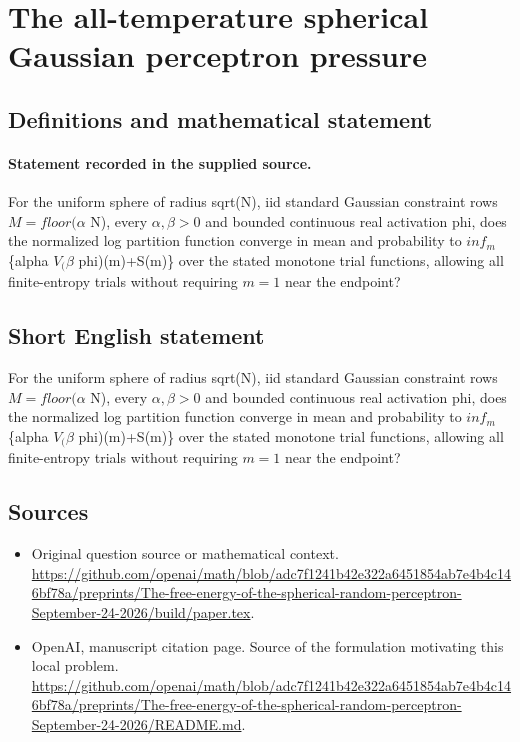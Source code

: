 \documentclass[11pt]{article}
\begin{document}
\section*{The all-temperature spherical Gaussian perceptron pressure}\label{statement}
\subsection{Definitions and mathematical statement}
\paragraph{Statement recorded in the supplied source.}
For the uniform sphere of radius sqrt(N), iid standard Gaussian constraint rows $M=floor(\alpha $ N), every $\alpha ,\beta >0$ and bounded continuous real activation phi, does the normalized log partition function converge in mean and probability to $inf_m$ \{alpha $V_(\beta $ phi)(m)+S(m)\} over the stated monotone trial functions, allowing all finite-entropy trials without requiring $m=1$ near the endpoint?
\subsection{Short English statement}
For the uniform sphere of radius sqrt(N), iid standard Gaussian constraint rows $M=floor(\alpha $ N), every $\alpha ,\beta >0$ and bounded continuous real activation phi, does the normalized log partition function converge in mean and probability to $inf_m$ \{alpha $V_(\beta $ phi)(m)+S(m)\} over the stated monotone trial functions, allowing all finite-entropy trials without requiring $m=1$ near the endpoint?
\subsection{Sources}
\begin{itemize}
\item[S1] Original question source or mathematical context.
\url{https://github.com/openai/math/blob/adc7f1241b42e322a6451854ab7e4b4c146bf78a/preprints/The-free-energy-of-the-spherical-random-perceptron-September-24-2026/build/paper.tex}.
\item[S2] OpenAI, manuscript citation page. Source of the formulation motivating this local problem.
\url{https://github.com/openai/math/blob/adc7f1241b42e322a6451854ab7e4b4c146bf78a/preprints/The-free-energy-of-the-spherical-random-perceptron-September-24-2026/README.md}.
\end{itemize}
\end{document}
